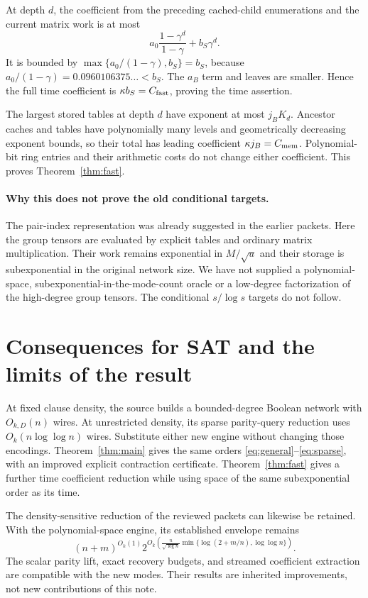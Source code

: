 \documentclass[11pt,letterpaper]{article}
\theoremstyle{definition}\newtheorem{definition}[theorem]{Definition}
\theoremstyle{remark}\newtheorem{remark}[theorem]{Remark}
\begin{document}
At depth $d$, the coefficient from the preceding cached-child enumerations
and the current matrix work is at most
\[
 a_0\frac{1-\gamma^d}{1-\gamma}+b_S\gamma^d.
\]
It is bounded by
$\max\{a_0/(1-\gamma),b_S\}=b_S$, because
$a_0/(1-\gamma)=0.0960106375\ldots<b_S$.
The $a_B$ term and leaves are smaller. Hence the full time coefficient is
$\kappa b_S=C_{\rm fast}$, proving the time assertion.

The largest stored tables at depth $d$ have exponent at most $j_BK_d$.
Ancestor caches and tables have polynomially many levels and geometrically
decreasing exponent bounds, so their total has leading coefficient
$\kappa j_B=C_{\rm mem}$. Polynomial-bit ring entries and their arithmetic
costs do not change either coefficient. This proves
Theorem~\ref{thm:fast}.

\paragraph{Why this does not prove the old conditional targets.}
The pair-index representation was already suggested in the earlier packets.
Here the group tensors are evaluated by explicit tables and ordinary matrix
multiplication. Their work remains exponential in $M/\sqrt u$ and their
storage is subexponential in the original network size. We have not supplied
a polynomial-space, subexponential-in-the-mode-count oracle or a low-degree
factorization of the high-degree group tensors. The conditional
$s/\log s$ targets do not follow.

\section{Consequences for SAT and the limits of the result}
\label{sec:sat}

At fixed clause density, the source builds a bounded-degree Boolean network
with $O_{k,D}(n)$ wires. At unrestricted density, its sparse parity-query
reduction uses $O_k(n\log\log n)$ wires. Substitute either new engine
without changing those encodings. Theorem~\ref{thm:main} gives the same
orders \eqref{eq:general}--\eqref{eq:sparse}, with an improved explicit
contraction certificate. Theorem~\ref{thm:fast} gives a further time
coefficient reduction while using space of the same subexponential order
as its time.

The density-sensitive reduction of the reviewed packets can likewise be
retained. With the polynomial-space engine, its established envelope remains
\[
 (n+m)^{O_k(1)}
 2^{O_k\left(\frac{n}{\sqrt{\log n}}
       \min\{\log(2+m/n),\log\log n\}\right)}.
\]
The scalar parity lift, exact recovery budgets, and streamed coefficient
extraction are compatible with the new modes. Their results are inherited
improvements, not new contributions of this note.
\end{document}
